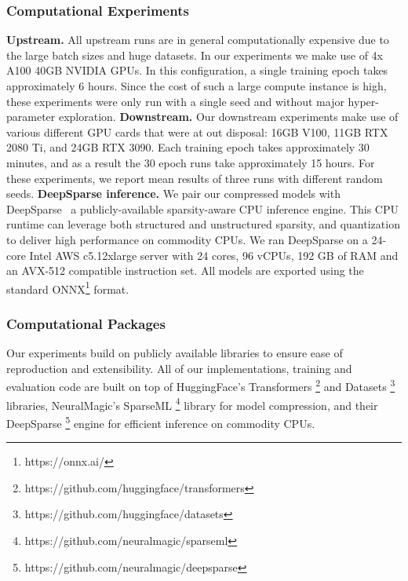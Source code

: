 \documentclass[11pt]{article}
\begin{document}
{\subsubsection{Computational Experiments}
\noindent\textbf{Upstream.} All upstream runs are in general computationally expensive due to the large batch sizes and huge datasets. In our experiments we make use of 4x A100 40GB NVIDIA GPUs. In this configuration, a single training epoch takes approximately 6 hours. Since the cost of such a large compute instance is high, these experiments were only run with a single seed and without major hyper-parameter exploration.
\noindent\textbf{Downstream.} Our downstream experiments make use of various different GPU cards that were at out disposal: 16GB V100, 11GB RTX 2080 Ti, and 24GB RTX 3090. Each training epoch takes approximately 30 minutes, and as a result the 30 epoch runs take approximately 15 hours. For these experiments, we report mean results of three runs with different random seeds.
\noindent\textbf{DeepSparse inference.} We pair our compressed models with DeepSparse~\cite{deepsparse} a publicly-available sparsity-aware CPU inference engine. This CPU runtime can leverage both structured and unstructured sparsity, and quantization to deliver high performance on commodity CPUs. We ran DeepSparse on a 24-core Intel AWS c5.12xlarge server with 24 cores, 96 vCPUs, 192 GB of RAM and an AVX-512 compatible instruction set. All models are exported using the standard ONNX\footnote{https://onnx.ai/} format.

\subsubsection{Computational Packages}
Our experiments build on publicly available libraries to ensure ease of reproduction and extensibility. All of our implementations, training and evaluation code are built on top of HuggingFace's Transformers \footnote{https://github.com/huggingface/transformers} and Datasets \footnote{https://github.com/huggingface/datasets} libraries, NeuralMagic's SparseML \footnote{https://github.com/neuralmagic/sparseml} library for model compression, and their DeepSparse \footnote{https://github.com/neuralmagic/deepsparse} engine for efficient inference on commodity CPUs.
}
\end{document}
